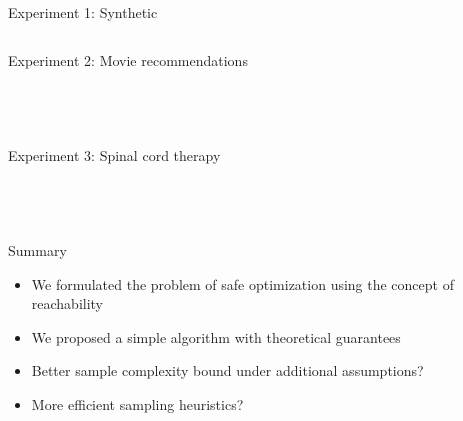 \documentclass[10pt,mathserif]{beamer}
\newlength\figureheight
\newlength\figurewidth
\begin{document}
\begin{frame}{Experiment 1: Synthetic}
\begin{columns}[c]
\centering
\setlength\figurewidth{3in}
\setlength\figureheight{4in}

\setlength\figurewidth{2.5in}
\setlength\figureheight{3.7in}

\end{columns}
\end{frame}

\begin{frame}{Experiment 2: Movie recommendations}
\begin{columns}[c]
\centering
\setlength\figurewidth{2.5in}
\setlength\figureheight{1.7in}
\\

\setlength\figurewidth{2.5in}
\setlength\figureheight{3.6in}

\end{columns}
\end{frame}

\begin{frame}{Experiment 3: Spinal cord therapy}
\begin{columns}[c]
\centering
\setlength\figurewidth{2.5in}
\setlength\figureheight{1.7in}
\\

\setlength\figurewidth{2.5in}
\setlength\figureheight{3.6in}

\end{columns}
\end{frame}

\begin{frame}{Summary}
\begin{itemize}
\item We formulated the problem of safe optimization using the concept of reachability
\vspace{2em}
\item We proposed a simple algorithm with theoretical guarantees
\vspace{2em}
\item Better sample complexity bound under additional assumptions?
\vspace{2em}
\item More efficient sampling heuristics?
\end{itemize}
\end{frame}
\end{document}
